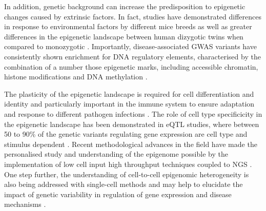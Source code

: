 In addition, genetic background can increase the predisposition to epigenetic changes caused by extrinsic factors. In fact, studies have demonstrated differences in response to environmental factors by different mice breeds as well as greater differences in the epigenetic landscape between human dizygotic twins when compared to monozygotic \parencite{Pogribny2009,Kaminsky2009}. Importantly, disease-associated GWAS variants have consistently shown enrichment for DNA regulatory elements, characterised by the combination of a number those epigenetic marks, including accessible chromatin, histone modifications and DNA methylation . 

The plasticity of the epigenetic landscape is required for cell differentiation and identity and particularly important in the immune system to ensure adaptation and response to different pathogen infections \parencite{Yosef2016}. The role of cell type specificicity in the epigenetic landscape has been demonstrated in eQTL studies, where between 50 to 90\% of the genetic variants regulating gene expression are cell type and stimulus dependent \parencite{Dimas2009,Nica2011,Fairfax2012,Fairfax2014,Raj2014,Naranbhai2015,Kasela2017}. Recent methodological advances in the field have made the personalised study and understanding of the epigenome possible by the implementation of low cell input high throughput techniques coupled to NGS \parencite{Buenrostro2013, Schmidl2015,Oudelaar2017}. One step further, the understanding of cell-to-cell epigenomic heterogeneity is also being addressed with single-cell methods and may help to elucidate the impact of genetic variability in regulation of gene expression and disease mechanisms \parencite{Buenrostro2015, Cusanovich2015,Rotem2015,Nagano2013,Smallwood2014}.




